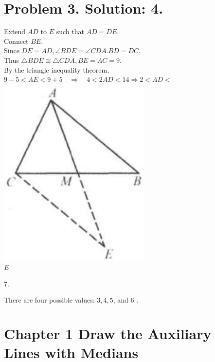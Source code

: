 \documentclass[10pt]{article}
\begin{document}
\section*{Problem 3. Solution: 4.}
Extend \(A D\) to \(E\) such that \(A D=D E\).\\
Connect \(B E\).\\
Since \(D E=A D, \angle B D E=\angle C D A . B D=D C\).\\
Thus \(\triangle B D E \cong \triangle C D A, B E=A C=9\).\\
By the triangle inequality theorem,\\
\(9-5<A E<9+5 \quad \Rightarrow \quad 4<2 A D<14 \Rightarrow 2<A D<\)\\
\includegraphics[max width=\textwidth, center]{2025_04_17_97bc1f7e44d93c271a88g-029(1)}\\
\(E\)

7.

There are four possible values: \(3,4,5\), and 6 .

\section*{Chapter 1 Draw the Auxiliary Lines with Medians}
\end{document}
